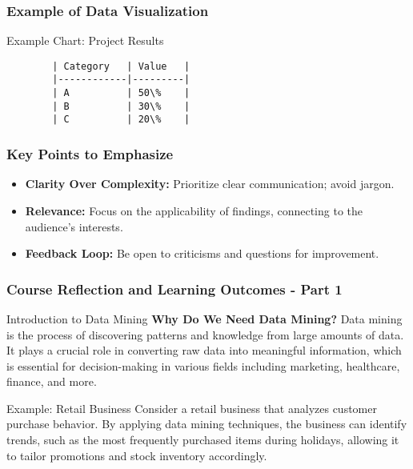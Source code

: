 \documentclass[aspectratio=169]{beamer}
\begin{document}
\begin{frame}[fragile]
    \frametitle{Example of Data Visualization}
    \begin{block}{Example Chart: Project Results}
        \begin{verbatim}
        | Category   | Value   |
        |------------|---------|
        | A          | 50\%    |
        | B          | 30\%    |
        | C          | 20\%    |
        \end{verbatim}
    \end{block}
\end{frame}

\begin{frame}[fragile]
    \frametitle{Key Points to Emphasize}
    \begin{itemize}
        \item \textbf{Clarity Over Complexity:} Prioritize clear communication; avoid jargon.
        \item \textbf{Relevance:} Focus on the applicability of findings, connecting to the audience’s interests.
        \item \textbf{Feedback Loop:} Be open to criticisms and questions for improvement.
    \end{itemize}
\end{frame}

\begin{frame}[fragile]
    \frametitle{Course Reflection and Learning Outcomes - Part 1}
    
    \begin{block}{Introduction to Data Mining}
        \textbf{Why Do We Need Data Mining?}  
        Data mining is the process of discovering patterns and knowledge from large amounts of data. It plays a crucial role in converting raw data into meaningful information, which is essential for decision-making in various fields including marketing, healthcare, finance, and more.
    \end{block}
    
    \begin{exampleblock}{Example: Retail Business}
        Consider a retail business that analyzes customer purchase behavior. By applying data mining techniques, the business can identify trends, such as the most frequently purchased items during holidays, allowing it to tailor promotions and stock inventory accordingly.
    \end{exampleblock}
\end{frame}
\end{document}
